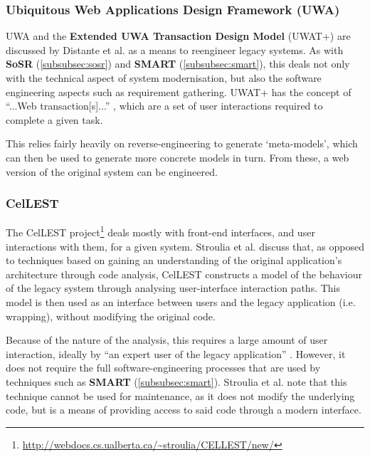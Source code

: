 \documentclass[12pt,journal,compsoc]{IEEEtran}
\begin{document}
\subsubsection{Ubiquitous Web Applications Design Framework (UWA)}
\label{subsubsec:uwa}
UWA \cite{UWAConsortium2002} and the \textbf{Extended UWA Transaction Design Model} (UWAT+) \cite{Distante2005} are discussed by Distante et al. \cite{Distante2006} as a means to reengineer legacy systems. As with \textbf{SoSR} (\autoref{subsubsec:sosr}) and \textbf{SMART} (\autoref{subsubsec:smart}), this deals not only with the technical aspect of system modernisation, but also the software engineering aspects such as requirement gathering. UWAT+ has the concept of ``...Web transaction[s]...'' \cite{Distante2006}, which are a set of user interactions required to complete a given task.

This relies fairly heavily on reverse-engineering to generate `meta-models', which can then be used to generate more concrete models in turn. From these, a web version of the original system can be engineered.

\subsubsection{CelLEST}
\label{subsubsec:cellest}
The CelLEST project\footnote{\url{http://webdocs.cs.ualberta.ca/~stroulia/CELLEST/new/}} deals mostly with front-end interfaces, and user interactions with them, for a given system. Stroulia et al. \cite{Stroulia2002} discuss that, as opposed to techniques based on gaining an understanding of the original application's architecture through code analysis, CelLEST constructs a model of the behaviour of the legacy system through analysing user-interface interaction paths. This model is then used as an interface between users and the legacy application (i.e. wrapping), without modifying the original code.

Because of the nature of the analysis, this requires a large amount of user interaction, ideally by ``an expert user of the legacy application'' \cite{Stroulia2002}. However, it does not require the full software-engineering processes that are used by techniques such as \textbf{SMART} (\autoref{subsubsec:smart}). Stroulia et al. note that this technique cannot be used for maintenance, as it does not modify the underlying code, but is a means of providing access to said code through a modern interface.
\end{document}
